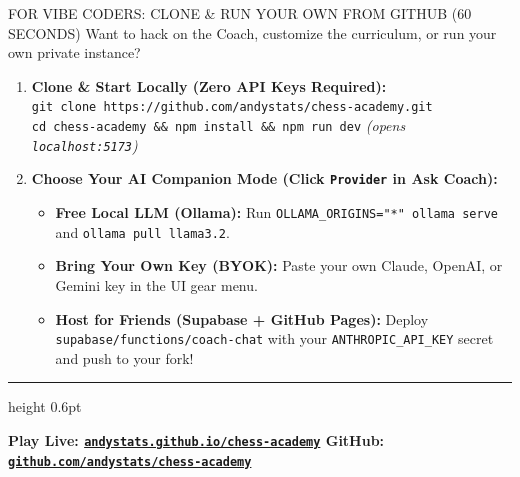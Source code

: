 \documentclass[10pt,twoside]{article}
\begin{document}
\vspace{2pt}
\begin{supplementbox}{FOR VIBE CODERS: CLONE \& RUN YOUR OWN FROM GITHUB (60 SECONDS)}
\scriptsize
Want to hack on the Coach, customize the curriculum, or run your own private instance?
\begin{enumerate}[leftmargin=13pt, itemsep=1.5pt, topsep=1pt]
  \item \textbf{Clone \& Start Locally (Zero API Keys Required):}\\
  \texttt{git clone https://github.com/andystats/chess-academy.git}\\
  \texttt{cd chess-academy \&\& npm install \&\& npm run dev} \hfill \emph{(opens \texttt{localhost:5173})}
  \item \textbf{Choose Your AI Companion Mode (Click \texttt{Provider} in Ask Coach):}
  \begin{itemize}[leftmargin=10pt, itemsep=0.5pt, topsep=0.5pt]
    \item \textbf{Free Local LLM (Ollama):} Run \texttt{OLLAMA\_ORIGINS="*" ollama serve} and \texttt{ollama pull llama3.2}.
    \item \textbf{Bring Your Own Key (BYOK):} Paste your own Claude, OpenAI, or Gemini key in the UI gear menu.
    \item \textbf{Host for Friends (Supabase + GitHub Pages):} Deploy \texttt{supabase/functions/coach-chat} with your \texttt{ANTHROPIC\_API\_KEY} secret and push to your fork!
  \end{itemize}
\end{enumerate}
\end{supplementbox}

\vfill
\begin{center}
  {\color{rulecolor}\hrule height 0.6pt}
  \vspace{3pt}
  {\scriptsize\sffamily\bfseries Play Live: \href{https://andystats.github.io/chess-academy/}{\texttt{andystats.github.io/chess-academy}} \hspace{6pt}\textbar\hspace{6pt} GitHub: \href{https://github.com/andystats/chess-academy}{\texttt{github.com/andystats/chess-academy}}}
\end{center}
\end{document}

